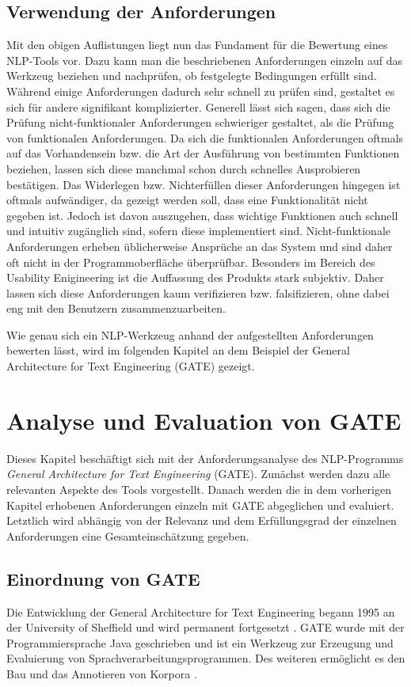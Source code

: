 \documentclass[12pt]{report}
\begin{document}
\section{Verwendung der Anforderungen}
Mit den obigen Auflistungen liegt nun das Fundament für die Bewertung eines NLP-Tools vor. Dazu kann man die beschriebenen Anforderungen einzeln auf das Werkzeug beziehen und nachprüfen, ob festgelegte Bedingungen erfüllt sind. Während einige Anforderungen dadurch sehr schnell zu prüfen sind, gestaltet es sich für andere signifikant komplizierter. Generell lässt sich sagen, dass sich die Prüfung nicht-funktionaler Anforderungen schwieriger gestaltet, als die Prüfung von funktionalen Anforderungen\cite{bal98}. Da sich die funktionalen Anforderungen oftmals auf das Vorhandensein bzw. die Art der Ausführung von bestimmten Funktionen beziehen, lassen sich diese manchmal schon durch schnelles Ausprobieren bestätigen. Das Widerlegen bzw. Nichterfüllen dieser Anforderungen hingegen ist oftmals aufwändiger, da gezeigt werden soll, dass eine Funktionalität nicht gegeben ist. Jedoch ist davon auszugehen, dass wichtige Funktionen auch schnell und intuitiv zugänglich sind, sofern diese implementiert sind. 
Nicht-funktionale Anforderungen erheben üblicherweise Ansprüche an das System und sind daher oft nicht in der Programmoberfläche überprüfbar. Besonders im Bereich des Usability Enigineering ist die Auffassung des Produkts stark subjektiv. Daher lassen sich diese Anforderungen kaum verifizieren bzw. falsifizieren, ohne dabei eng mit den Benutzern zusammenzuarbeiten. 

Wie genau sich ein NLP-Werkzeug anhand der aufgestellten Anforderungen bewerten lässt, wird im folgenden Kapitel an dem Beispiel der General Architecture for Text Engineering (GATE) gezeigt. 

\chapter{Analyse und Evaluation von GATE}
Dieses Kapitel beschäftigt sich mit der Anforderungsanalyse des NLP-Programms \textit{General Architecture for Text Engineering} (GATE). Zunächst werden dazu alle relevanten Aspekte des Tools vorgestellt. Danach werden die in dem vorherigen Kapitel erhobenen Anforderungen einzeln mit GATE abgeglichen und evaluiert. Letztlich wird abhängig von der Relevanz und dem Erfüllungsgrad der einzelnen Anforderungen eine Gesamteinschätzung gegeben.

\section{Einordnung von GATE}
Die Entwicklung der General Architecture for Text Engineering begann 1995 an der University of Sheffield und wird permanent fortgesetzt \cite{cgw95}. GATE wurde mit der Programmiersprache Java geschrieben  und ist ein Werkzeug zur Erzeugung und Evaluierung von Sprachverarbeitungsprogrammen. Des weiteren ermöglicht es den Bau und das Annotieren von Korpora \cite{cmb02}. 
\end{document}

